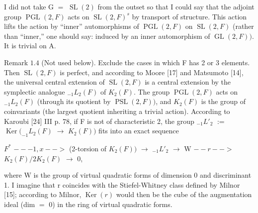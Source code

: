 \documentclass[10pt,a4paper]{article}
\begin{document}
\par I did not take G $=$ $\operatorname{SL}(2)$ from the outset so that I could say that the adjoint group $\operatorname{PGL}(2,F)$ acts on $\operatorname{SL}(2,F)^s$ by transport of structure. This action lifts the action by ``inner'' automorphisms of $\operatorname{PGL}(2,F)$ on $\operatorname{SL}(2,F)$ (rather than ``inner,'' one should say: induced by an inner automorphism of $\operatorname{GL}(2,F))$. It is trivial on A.\par
\par Remark $1.4$ (Not used below). Exclude the cases in which F has 2 or 3 elements. Then $\operatorname{SL}(2,F)$ is perfect, and according to Moore [17] and Matsumoto [14], the universal central extension of $\operatorname{SL}(2,F)$ is a central extension by the symplectic analogue $_{-1}L_2(F)$ of $K_2(F)$. The group $\operatorname{PGL}(2,F)$ acts on $_{-1}L_2(F)$ (through its quotient by $\operatorname{PSL}(2,F))$, and $K_2(F)$ is the group of coinvariants (the largest quotient inheriting a trivial action). According to Karoubi [24] III p. 78, if F is not of characteristic 2, the group $_{-1}L'_2$ $:=$ $\operatorname{Ker}(_{-1}L_2(F)$ $\to{}$ $K_2(F))$ fits into an exact sequence\par
\par $F^*$ $--{-1,x}-->$ (2-torsion of $K_2(F))$ $\to{}$ $_{-1}L'_2$ $\to{}$ W $--r-->$ $K_2(F)/2K_2(F)$ $\to{}$ 0,\par
\par where W is the group of virtual quadratic forms of dimension 0 and discriminant 1. I imagine that r coincides with the Stiefel-Whitney class defined by Milnor [15]; according to Milnor, $\operatorname{Ker}(r)$ would then be the cube of the augmentation ideal (dim $=$ 0) in the ring of virtual quadratic forms.\par
\end{document}
